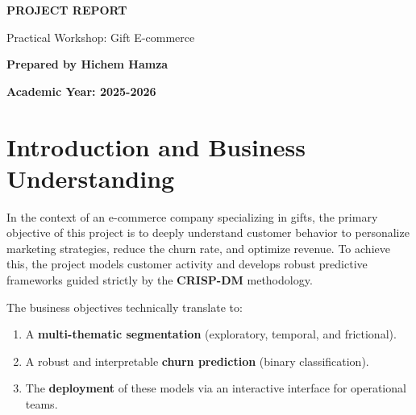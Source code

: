 \documentclass[11pt,a4paper]{article}
\begin{document}
\begin{titlepage}

\vspace{6cm}

\begin{center}
{\LARGE\textbf{PROJECT REPORT}}\par
\vspace{1cm}
{\large Practical Workshop: Gift E-commerce}\par
\vspace{2cm}
{\large \textbf{Prepared by Hichem Hamza}}
\vspace{3cm}


\vspace{2cm}



\vspace{5cm}

{\textbf{Academic Year: 2025-2026}}

\end{center}
\vfill
\end{titlepage}

\section{Introduction and Business Understanding}

In the context of an e-commerce company specializing in gifts, the primary objective of this project is to deeply understand customer behavior to personalize marketing strategies, reduce the churn rate, and optimize revenue. To achieve this, the project models customer activity and develops robust predictive frameworks guided strictly by the \textbf{CRISP-DM} methodology.

The business objectives technically translate to:
\begin{enumerate}
    \item A \textbf{multi-thematic segmentation} (exploratory, temporal, and frictional).
    \item A robust and interpretable \textbf{churn prediction} (binary classification).
    \item The \textbf{deployment} of these models via an interactive interface for operational teams.
\end{enumerate}
\end{document}
